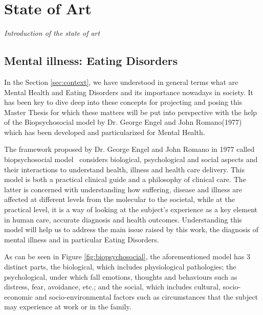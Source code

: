 \chapter{State of Art}
\label{chap:state-of-art}
\textit{Introduction of the state of art}

\clearpage
\section{Mental illness: Eating Disorders}
In the Section \ref{sec:context}, we have understood in general terms what are Mental Health and Eating Disorders and its importance nowadays in society. It has been key to dive deep into these concepts for projecting and posing this Master Thesis for which these matters will be put into perspective with the help of the Biopsychosocial model by Dr. George Engel and John Romano(1977) which has been developed and particularized for Mental Health.


The framework proposed by Dr. George Engel and John Romano in 1977 called biopsychosocial model~\cite{WhatisBi40:online} considers biological, psychological and social aspects and their interactions to understand health, illness and health care delivery. This model is both a practical clinical guide and a philosophy of clinical care. The latter is concerned with understanding how suffering, disease and illness are affected at different levels from the molecular to the societal, while at the practical level, it is a way of looking at the subject's experience as a key element in human care, accurate diagnosis and health outcomes. Understanding this model will help us to address the main issue raised by this work, the diagnosis of mental illness and in particular Eating Disorders.

As can be seen in Figure \ref{fig:biopsychosocial}, the aforementioned model has 3 distinct parts, the biological, which includes physiological pathologies; the psychological, under which fall emotions, thoughts and behaviours such as distress, fear, avoidance, etc.; and the social, which includes cultural, socio-economic and socio-environmental factors such as circumstances that the subject may experience at work or in the family.

